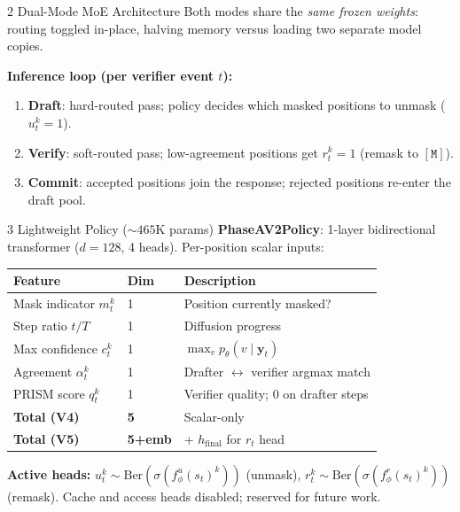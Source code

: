\documentclass[final]{beamer}
\newlength{\colsep}   \setlength{\colsep}{0.7cm}
\newlength{\colwidth} \setlength{\colwidth}{0.306\paperwidth}
\newcommand{\mask}{\ensuremath{\mathtt{[M]}}}
\begin{document}
\begin{frame}[t]
\begin{columns}[t]
\begin{column}{\colwidth}
\begin{block}{2 \quad Dual-Mode MoE Architecture}
Both modes share the \emph{same frozen weights}: routing toggled in-place,
halving memory versus loading two separate model copies.

\medskip\noindent
\textbf{Inference loop (per verifier event $t$):}
\begin{enumerate}\itemsep2pt
  \item \textbf{Draft}: hard-routed pass; policy decides which masked
        positions to unmask ($u_t^k{=}1$).
  \item \textbf{Verify}: soft-routed pass; low-agreement positions
        get $r_t^k{=}1$ (remask to $\mask$).
  \item \textbf{Commit}: accepted positions join the response;
        rejected positions re-enter the draft pool.
\end{enumerate}
\end{block}

\begin{block}{3 \quad Lightweight Policy (${\sim}465$K params)}
\textbf{PhaseAV2Policy}: 1-layer bidirectional transformer
($d{=}128$, 4 heads).  Per-position scalar inputs:

\vspace{0.3cm}
\begin{center}
\setlength{\tabcolsep}{7pt}
\renewcommand{\arraystretch}{1.3}
\begin{tabular}{lll}
\toprule
\textbf{Feature} & \textbf{Dim} & \textbf{Description} \\
\midrule
Mask indicator $m_t^k$  & 1 & Position currently masked? \\
Step ratio $t/T$         & 1 & Diffusion progress \\
Max confidence $c_t^k$   & 1 & $\max_v p_\theta(v\mid\mathbf{y}_t)$ \\
Agreement $\alpha_t^k$   & 1 & Drafter $\leftrightarrow$ verifier argmax match \\
PRISM score $q_t^k$      & 1 & Verifier quality; 0 on drafter steps \\
\midrule
\textbf{Total (V4)} & \textbf{5} & Scalar-only \\
\textbf{Total (V5)} & \textbf{5+emb} & + $h_{\mathrm{final}}$ for $r_t$ head \\
\bottomrule
\end{tabular}
\end{center}

\medskip\noindent
\textbf{Active heads:}
$u_t^k \!\sim\! \mathrm{Ber}(\sigma(f_\phi^u\!(s_t)^k))$ (unmask),
$r_t^k \!\sim\! \mathrm{Ber}(\sigma(f_\phi^r\!(s_t)^k))$ (remask).
Cache and access heads disabled; reserved for future work.
\end{block}


\end{column}
\end{columns}
\end{frame}
\end{document}
